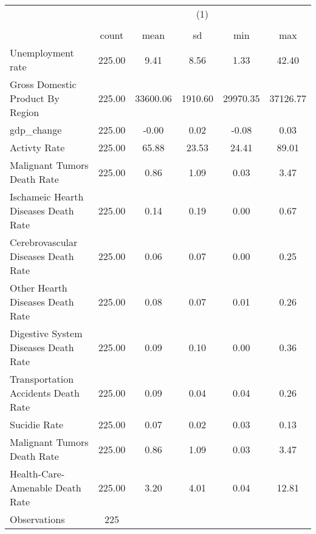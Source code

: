 {
\def\sym#1{\ifmmode^{#1}\else\(^{#1}\)\fi}
\begin{tabular}{l*{1}{ccccc}}
\hline\hline
                    &\multicolumn{5}{c}{(1)}                                                  \\
                    &\multicolumn{5}{c}{}                                                     \\
                    &       count         &        mean&          sd&         min&         max\\
\hline
Unemployment rate   &      225.00         &        9.41&        8.56&        1.33&       42.40\\
Gross Domestic Product By Region&      225.00         &    33600.06&     1910.60&    29970.35&    37126.77\\
gdp\_change          &      225.00         &       -0.00&        0.02&       -0.08&        0.03\\
Activty Rate        &      225.00         &       65.88&       23.53&       24.41&       89.01\\
Malignant Tumors Death Rate&      225.00         &        0.86&        1.09&        0.03&        3.47\\
Ischameic Hearth Diseases Death Rate&      225.00         &        0.14&        0.19&        0.00&        0.67\\
Cerebrovascular Diseases Death Rate&      225.00         &        0.06&        0.07&        0.00&        0.25\\
Other Hearth Diseases Death Rate&      225.00         &        0.08&        0.07&        0.01&        0.26\\
Digestive System Diseases Death Rate&      225.00         &        0.09&        0.10&        0.00&        0.36\\
Transportation Accidents Death Rate&      225.00         &        0.09&        0.04&        0.04&        0.26\\
Sucidie Rate        &      225.00         &        0.07&        0.02&        0.03&        0.13\\
Malignant Tumors Death Rate&      225.00         &        0.86&        1.09&        0.03&        3.47\\
Health-Care-Amenable Death Rate&      225.00         &        3.20&        4.01&        0.04&       12.81\\
\hline
Observations        &         225         &            &            &            &            \\
\hline\hline
\end{tabular}
}
